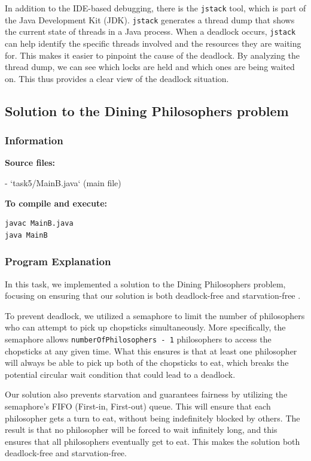 \documentclass{article}
\begin{document}
In addition to the IDE-based debugging, there is the \texttt{jstack} tool, which is part of the Java Development Kit (JDK). \texttt{jstack} generates a thread dump that shows the current state of threads in a Java process. When a deadlock occurs, \texttt{jstack} can help identify the specific threads involved and the resources they are waiting for. This makes it easier to pinpoint the cause of the deadlock. By analyzing the thread dump, we can see which locks are held and which ones are being waited on. This thus provides a clear view of the deadlock situation.



\subsection{Solution to the Dining Philosophers problem}

\subsubsection{Information}
\textbf{Source files:}

- `task5/MainB.java` (main file)

\textbf{To compile and execute:}
\begin{lstlisting}[style=bash]
javac MainB.java
java MainB
\end{lstlisting}

\subsubsection{Program Explanation}
In this task, we implemented a solution to the Dining Philosophers problem, focusing on ensuring that our solution is both deadlock-free and starvation-free \cite{85Dining71:online}.

To prevent deadlock, we utilized a semaphore to limit the number of philosophers who can attempt to pick up chopsticks simultaneously. More specifically, the semaphore allows \texttt{numberOfPhilosophers - 1} philosophers to access the chopsticks at any given time. What this ensures is that at least one philosopher will always be able to pick up both of the chopsticks to eat, which breaks the potential circular wait condition that could lead to a deadlock.

Our solution also prevents starvation and guarantees fairness by utilizing the semaphore's FIFO (First-in, First-out) queue. This will ensure that each philosopher gets a turn to eat, without being indefinitely blocked by others. The result is that no philosopher will be forced to wait infinitely long, and this ensures that all philosophers eventually get to eat. This makes the solution both deadlock-free and starvation-free.
\end{document}
